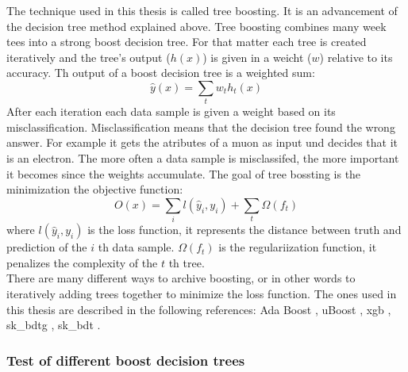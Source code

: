 \documentclass[english]{uzhpub}
\begin{document}
The technique used in this thesis is called tree boosting. It is an advancement of the decision tree method explained above. Tree boosting combines many week tees into a strong boost decision tree. For that matter each tree is created iteratively and the tree's output ($h(x)$) is given in a weicht ($w$) relative to its accuracy. Th output of a boost decision tree is a weighted sum:
\begin{equation}
  \hat{y} (x) = \sum_t w_t h_t (x)
\end{equation}
After each iteration each data sample is given a weight based on its misclassification. Misclassification means that the decision tree found the wrong answer. For example it gets the atributes of a muon as input und decides that it is an electron. The more often a data sample is misclassifed, the more important it becomes since the weights accumulate. The goal of tree bossting is the minimization the objective function:
\begin{equation}
  O(x) = \sum_i l(\hat{y}_i,y_i) + \sum_t \Omega(f_t)
\end{equation}
where $l(\hat{y}_i,y_i)$ is the loss function, it represents the distance between truth and prediction of the $i$ th data sample. $\Omega(f_t)$ is the regulariization function, it penalizes the complexity of the $t$ th tree. \\
There are many different ways to archive boosting, or in other words to iteratively adding trees together to minimize the loss function. The ones used in this thesis are described in the following references: Ada Boost \cite{bib:AdaBoost}, uBoost \cite{bib:uBoost}, xgb \cite{bib:xgb}, sk\_bdtg \cite{bib:bdtg}, sk\_bdt \cite{bib:bdt}.



 \subsubsection{Test of different boost decision trees}
\end{document}
